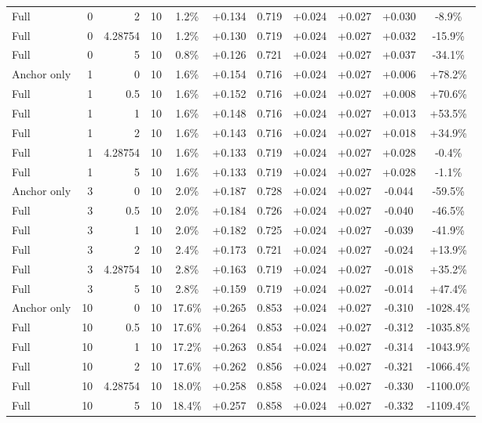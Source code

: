 \begin{table}[htbp]
\begin{tabular}{lrrrccccccc}
Full & 0 & 2 & 10 & 1.2\% & +0.134 & 0.719 & +0.024 & +0.027 & +0.030 & -8.9\% \\
Full & 0 & 4.28754 & 10 & 1.2\% & +0.130 & 0.719 & +0.024 & +0.027 & +0.032 & -15.9\% \\
Full & 0 & 5 & 10 & 0.8\% & +0.126 & 0.721 & +0.024 & +0.027 & +0.037 & -34.1\% \\
Anchor only & 1 & 0 & 10 & 1.6\% & +0.154 & 0.716 & +0.024 & +0.027 & +0.006 & +78.2\% \\
Full & 1 & 0.5 & 10 & 1.6\% & +0.152 & 0.716 & +0.024 & +0.027 & +0.008 & +70.6\% \\
Full & 1 & 1 & 10 & 1.6\% & +0.148 & 0.716 & +0.024 & +0.027 & +0.013 & +53.5\% \\
Full & 1 & 2 & 10 & 1.6\% & +0.143 & 0.716 & +0.024 & +0.027 & +0.018 & +34.9\% \\
Full & 1 & 4.28754 & 10 & 1.6\% & +0.133 & 0.719 & +0.024 & +0.027 & +0.028 & -0.4\% \\
Full & 1 & 5 & 10 & 1.6\% & +0.133 & 0.719 & +0.024 & +0.027 & +0.028 & -1.1\% \\
Anchor only & 3 & 0 & 10 & 2.0\% & +0.187 & 0.728 & +0.024 & +0.027 & -0.044 & -59.5\% \\
Full & 3 & 0.5 & 10 & 2.0\% & +0.184 & 0.726 & +0.024 & +0.027 & -0.040 & -46.5\% \\
Full & 3 & 1 & 10 & 2.0\% & +0.182 & 0.725 & +0.024 & +0.027 & -0.039 & -41.9\% \\
Full & 3 & 2 & 10 & 2.4\% & +0.173 & 0.721 & +0.024 & +0.027 & -0.024 & +13.9\% \\
Full & 3 & 4.28754 & 10 & 2.8\% & +0.163 & 0.719 & +0.024 & +0.027 & -0.018 & +35.2\% \\
Full & 3 & 5 & 10 & 2.8\% & +0.159 & 0.719 & +0.024 & +0.027 & -0.014 & +47.4\% \\
Anchor only & 10 & 0 & 10 & 17.6\% & +0.265 & 0.853 & +0.024 & +0.027 & -0.310 & -1028.4\% \\
Full & 10 & 0.5 & 10 & 17.6\% & +0.264 & 0.853 & +0.024 & +0.027 & -0.312 & -1035.8\% \\
Full & 10 & 1 & 10 & 17.2\% & +0.263 & 0.854 & +0.024 & +0.027 & -0.314 & -1043.9\% \\
Full & 10 & 2 & 10 & 17.6\% & +0.262 & 0.856 & +0.024 & +0.027 & -0.321 & -1066.4\% \\
Full & 10 & 4.28754 & 10 & 18.0\% & +0.258 & 0.858 & +0.024 & +0.027 & -0.330 & -1100.0\% \\
Full & 10 & 5 & 10 & 18.4\% & +0.257 & 0.858 & +0.024 & +0.027 & -0.332 & -1109.4\% \\

\end{tabular}
\end{table}
